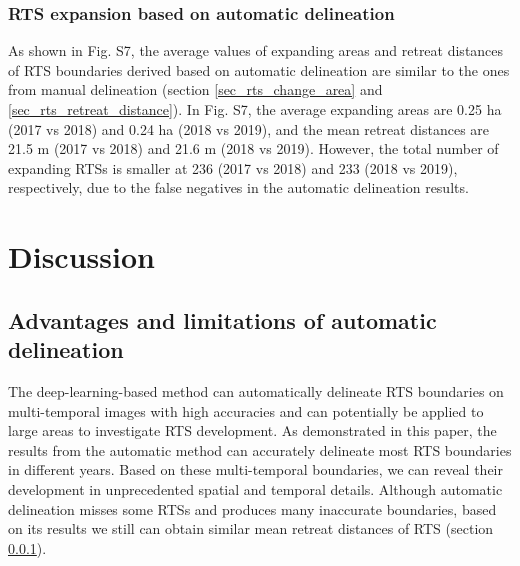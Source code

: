 \documentclass[authoryear,preprint,review,12pt]{elsarticle}
\begin{document}
 


\subsubsection{RTS expansion based on automatic delineation}
\label{sec_rts_change_auto_mapping}

As shown in Fig. S7, the average values of expanding areas and retreat distances of RTS boundaries derived based on automatic delineation are similar to the ones from manual delineation (section \ref{sec_rts_change_area} and \ref{sec_rts_retreat_distance}).
In Fig. S7, the average expanding areas are 0.25 ha (2017 vs 2018) and 0.24 ha (2018 vs 2019), and the mean retreat distances are 21.5 m (2017 vs 2018)  and 21.6 m (2018 vs 2019). 
However, the total number of expanding RTSs is smaller at 236 (2017 vs 2018) and 233 (2018 vs 2019), respectively, due to the false negatives in the automatic delineation results.

 

\section{Discussion}
\label{sec_discussion}

\subsection{Advantages and limitations of automatic delineation}
\label{sec_diss_mapping_rts_multi_images}

The deep-learning-based method can automatically delineate RTS boundaries on multi-temporal images with high accuracies and can potentially be applied to large areas to investigate RTS development. 
As demonstrated in this paper, the results from the automatic method can accurately delineate most RTS boundaries in different years.
Based on these multi-temporal boundaries, we can reveal their development in unprecedented spatial and temporal details. 
Although automatic delineation misses some RTSs and produces many inaccurate boundaries, based on its results we still can obtain similar mean retreat distances of RTS (section \ref{sec_rts_change_auto_mapping}). 
\end{document}
